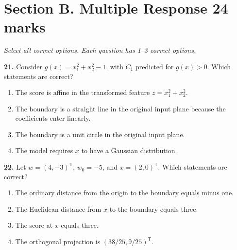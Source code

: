\documentclass[11pt,a4paper]{article}
\begin{document}
\newpage\section*{Section B. Multiple Response \hfill 24 marks}
\textit{Select all correct options. Each question has 1--3 correct options.}\par
\par\noindent\begin{minipage}{\linewidth}
\textbf{21.} Consider \(g(x)=x_1^2+x_2^2-1\), with \(C_1\) predicted for \(g(x)>0\). Which statements are correct?
\begin{enumerate}[label=(\Alph*),leftmargin=8mm,itemsep=2pt,topsep=2pt]
\item The score is affine in the transformed feature \(z=x_1^2+x_2^2\).
\item The boundary is a straight line in the original input plane because the coefficients enter linearly.
\item The boundary is a unit circle in the original input plane.
\item The model requires \(x\) to have a Gaussian distribution.
\end{enumerate}

\end{minipage}\par\vspace{3mm}
\par\noindent\begin{minipage}{\linewidth}
\textbf{22.} Let \(w=(4,-3)^{\mathsf T}\), \(w_0=-5\), and \(x=(2,0)^{\mathsf T}\). Which statements are correct?
\begin{enumerate}[label=(\Alph*),leftmargin=8mm,itemsep=2pt,topsep=2pt]
\item The ordinary distance from the origin to the boundary equals minus one.
\item The Euclidean distance from \(x\) to the boundary equals three.
\item The score at \(x\) equals three.
\item The orthogonal projection is \((38/25,9/25)^{\mathsf T}\).
\end{enumerate}

\end{minipage}\par\vspace{3mm}
\end{document}
